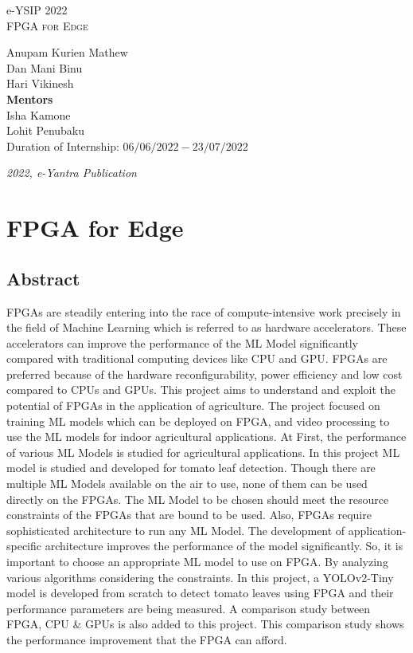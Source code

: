 \documentclass[a4paper,12pt,oneside]{book}
\begin{document}
\begin{titlepage}
\raggedright
{\Large e-YSIP 2022\\[1cm]}
{\Huge\scshape FPGA for Edge \\[.1in]}
\vfill
\begin{flushright}
{\large Anupam Kurien Mathew \\}
{\large Dan Mani Binu \\}
{\large Hari Vikinesh \\}
{\large \vspace{0.5cm} \textbf{Mentors \\}}
{\large Isha Kamone \\}
{\large Lohit Penubaku\\}
{\large Duration of Internship: $ 06/06/2022 - 23/07/2022 $ \\}
\end{flushright}

{\itshape 2022, e-Yantra Publication}
\end{titlepage}

\chapter[FPGA for Edge]{FPGA for Edge}
\section*{Abstract}
FPGAs are steadily entering into the race of compute-intensive work precisely in the field of Machine Learning which is referred to as hardware accelerators. These accelerators can improve the performance of the ML Model significantly compared with traditional computing devices like CPU and GPU. FPGAs are preferred because of the hardware reconfigurability, power efficiency and low cost compared to CPUs and GPUs. This project aims to understand and exploit the potential of FPGAs in the application of agriculture. The project focused on training ML models which can be deployed on FPGA, and video processing to use the ML models for indoor agricultural applications. At First, the performance of various ML Models is studied for agricultural applications. In this project ML model is studied and developed for tomato leaf detection. Though there are multiple ML Models available on the air to use, none of them can be used directly on the FPGAs. The ML Model to be chosen should meet the resource constraints of the FPGAs that are bound to be used. Also, FPGAs require sophisticated architecture to run any ML Model. The development of application-specific architecture improves the performance of the model significantly. So, it is important to choose an appropriate ML model to use on FPGA. By analyzing various algorithms considering the constraints. In this project, a YOLOv2-Tiny model is developed from scratch to detect tomato leaves using FPGA and their performance parameters are being measured. A comparison study between FPGA, CPU \& GPUs is also added to this project. This comparison study shows the performance improvement that the FPGA can afford.
\end{document}
